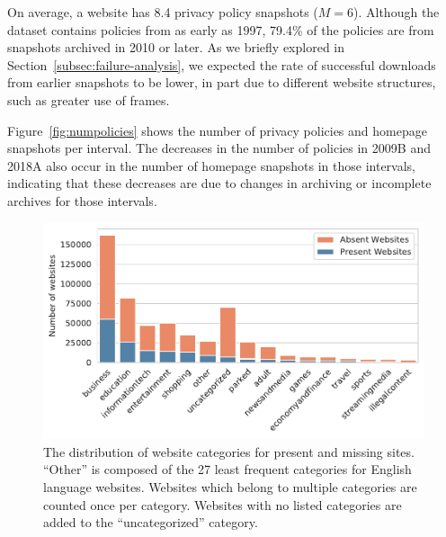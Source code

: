 On average, a website has 8.4 privacy policy snapshots ($M=6$). Although the dataset contains policies from as early as 1997, 79.4\% of the policies are from snapshots archived in 2010 or later.
As we briefly explored in Section~\ref{subsec:failure-analysis}, we expected the rate of successful downloads from earlier snapshots to be lower, in part due to different website structures, such as greater use of frames.

Figure~\ref{fig:numpolicies} shows the number of privacy policies and homepage snapshots per interval.
The decreases in the number of policies in 2009B and 2018A also occur in the number of homepage snapshots in those intervals, indicating that these decreases are due to changes in archiving or incomplete archives for those intervals.

\begin{figure}[t]
\centering
\includegraphics[width=1\columnwidth]{chapters/privacypolicies/figures/category_dist.pdf}

\caption{The distribution of website categories for present and missing sites. ``Other'' is composed of the 27 least frequent categories for English language websites. Websites which belong to multiple categories are counted once per category. Websites with no listed categories are added to the ``uncategorized'' category.}
\label{fig:cat_dist}
\end{figure}


